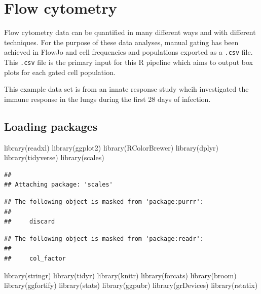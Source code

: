 \documentclass[
]{book}
\newenvironment{Shaded}{\begin{snugshade}}{\end{snugshade}}
\newcommand{\FunctionTok}[1]{\textcolor[rgb]{0.00,0.00,0.00}{#1}}
\newcommand{\NormalTok}[1]{#1}
\begin{document}
\hypertarget{flow-cytometry}{%
\chapter{Flow cytometry}\label{flow-cytometry}}

Flow cytometry data can be quantified in many different ways and with different techniques. For the purpose of these data analyses, manual gating has been achieved in FlowJo and cell frequencies and populations exported as a \texttt{.csv} file. This \texttt{.csv} file is the primary input for this R pipeline which aims to output box plots for each gated cell population.

This example data set is from an innate response study whcih investigated the immune response in the lungs during the first 28 days of infection.

\hypertarget{loading-packages}{%
\section{Loading packages}\label{loading-packages}}

\begin{Shaded}
\begin{Highlighting}[]
\FunctionTok{library}\NormalTok{(readxl)}
\FunctionTok{library}\NormalTok{(ggplot2)}
\FunctionTok{library}\NormalTok{(RColorBrewer)}
\FunctionTok{library}\NormalTok{(dplyr)}
\FunctionTok{library}\NormalTok{(tidyverse)}
\FunctionTok{library}\NormalTok{(scales)}
\end{Highlighting}
\end{Shaded}

\begin{verbatim}
## 
## Attaching package: 'scales'
\end{verbatim}

\begin{verbatim}
## The following object is masked from 'package:purrr':
## 
##     discard
\end{verbatim}

\begin{verbatim}
## The following object is masked from 'package:readr':
## 
##     col_factor
\end{verbatim}

\begin{Shaded}
\begin{Highlighting}[]
\FunctionTok{library}\NormalTok{(stringr)}
\FunctionTok{library}\NormalTok{(tidyr)}
\FunctionTok{library}\NormalTok{(knitr)}
\FunctionTok{library}\NormalTok{(forcats)}
\FunctionTok{library}\NormalTok{(broom)}
\FunctionTok{library}\NormalTok{(ggfortify)}
\FunctionTok{library}\NormalTok{(stats)}
\FunctionTok{library}\NormalTok{(ggpubr)}
\FunctionTok{library}\NormalTok{(grDevices)}
\FunctionTok{library}\NormalTok{(rstatix)}
\end{Highlighting}
\end{Shaded}
\end{document}
